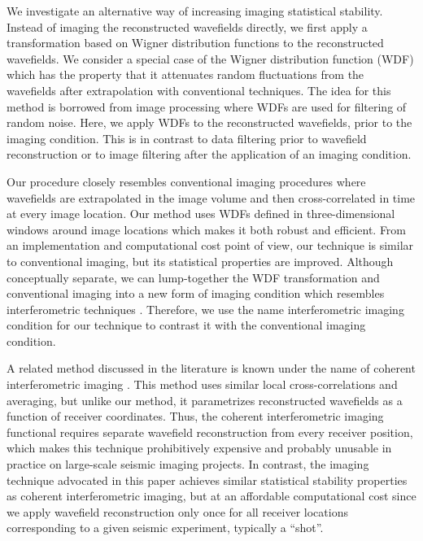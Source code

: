 We investigate an alternative way of increasing imaging statistical
stability. Instead of imaging the reconstructed wavefields directly,
we first apply a transformation based on Wigner distribution functions
\cite[]{Wigner.wdf} to the reconstructed wavefields. We consider a
special case of the Wigner distribution function (WDF) which has the
property that it attenuates random fluctuations from the wavefields
after extrapolation with conventional techniques. The idea for this
method is borrowed from image processing where WDFs are used for
filtering of random noise. Here, we apply WDFs to the reconstructed
wavefields, prior to the imaging condition. This is in contrast to
data filtering prior to wavefield reconstruction or to image filtering
after the application of an imaging condition.

Our procedure closely resembles conventional imaging procedures where
wavefields are extrapolated in the image volume and then
cross-correlated in time at every image location. Our method uses WDFs
defined in three-dimensional windows around image locations which
makes it both robust and efficient. From an implementation and
computational cost point of view, our technique is similar to
conventional imaging, but its statistical properties are
improved. Although conceptually separate, we can lump-together the WDF
transformation and conventional imaging into a new form of imaging
condition which resembles interferometric techniques
\cite[]{Papanicolaou:2004,Fouque:2005}. Therefore, we use the name
interferometric imaging condition for our technique to contrast it
with the conventional imaging condition.

A related method discussed in the literature is known under the name
of coherent interferometric imaging
\cite[]{Borcea.IP.2006,Borcea.GEO.2006,Borcea.Multiscale.2006}.  This
method uses similar local cross-correlations and averaging, but unlike
our method, it parametrizes reconstructed wavefields as a function of
receiver coordinates. Thus, the coherent interferometric imaging
functional requires separate wavefield reconstruction from every
receiver position, which makes this technique prohibitively expensive
and probably unusable in practice on large-scale seismic imaging
projects. In contrast, the imaging technique advocated in this paper
achieves similar statistical stability properties as coherent
interferometric imaging, but at an affordable computational cost since
we apply wavefield reconstruction only once for all receiver locations
corresponding to a given seismic experiment, typically a ``shot''.

